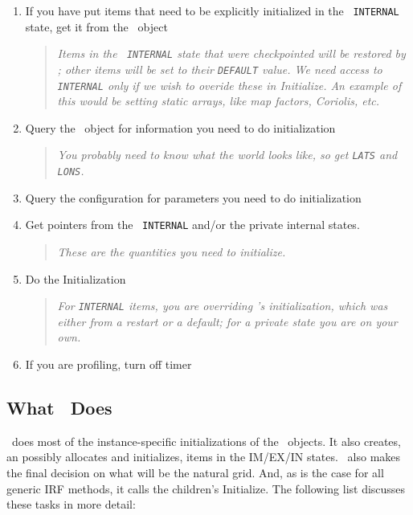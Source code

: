 \begin{enumerate}
\item If you have put items that need to be explicitly initialized in
  the \ggn\  {\tt INTERNAL} state, get it from the \ggn\  object
\begin{quote} {\em Items in the  \ggn\  {\tt INTERNAL} state that were
  checkpointed will be restored by \gint; other items will be set to
  their {\tt DEFAULT} value. We need access to {\tt INTERNAL} only if
  we wish to overide these in Initialize. An example of this would be
  setting static arrays, like map factors, Coriolis, etc.}
    \end{quote}

\item Query the \ggn\  object for information you need to do initialization
\begin{quote} {\em You probably need to know what the world looks
    like, so get {\tt LATS} and {\tt LONS}.} \end{quote}

\item Query the configuration for parameters you need to do initialization

\item Get pointers from the \ggn\  {\tt INTERNAL} and/or the private internal states. 
\begin{quote} {\em These are the quantities you need to initialize.} \end{quote}

\item Do the Initialization
\begin{quote} {\em For {\tt INTERNAL} items, you are overriding 
    \ggn 's initialization, which was either from a restart or a default; for a
    private state you are on your own.} \end{quote}

\item If you are profiling, turn off timer
\begin{quote} {\em } \end{quote}

\end{enumerate}

\subsection{What \gint\  Does}

\gint\  does most of the instance-specific initializations of
the \ggn\  objects. It also creates, an possibly allocates and
initializes, items in the IM/EX/IN states. \gint\  also makes the
final decision on what will be the natural grid. And, as is the
case for all generic IRF methods, it calls the children's Initialize.
The following list discusses these tasks in more detail:


